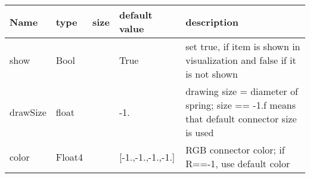 \begin{center}
  \footnotesize
  \begin{longtable}{| p{4.5cm} | p{2.5cm} | p{0.5cm} | p{2.5cm} | p{6cm} |}
    \hline
    \bf Name & \bf type & \bf size & \bf default value & \bf description \\ \hline
    show &     Bool &      &     True &     set true, if item is shown in visualization and false if it is not shown\\ \hline
    drawSize &     float &      &     -1. &     drawing size = diameter of spring; size == -1.f means that default connector size is used\\ \hline
    color &     Float4 &      &     [-1.,-1.,-1.,-1.] &     RGB connector color; if R==-1, use default color\\ \hline
	  \end{longtable}
	\end{center}

